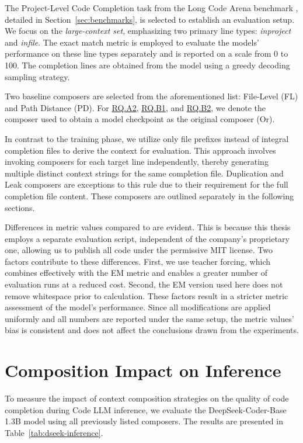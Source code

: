 The Project-Level Code Completion task from the Long Code Arena benchmark \parencite{bogomolov2024}, detailed in Section~\ref{sec:benchmarks}, is selected to establish an evaluation setup. We focus on the \textit{large-context set}, emphasizing two primary line types: \textit{inproject} and \textit{infile}. The exact match metric is employed to evaluate the models' performance on these line types separately and is reported on a scale from 0 to 100. The completion lines are obtained from the model using a greedy decoding sampling strategy.

Two baseline composers are selected from the aforementioned list: File-Level (FL) and Path Distance (PD). For \hyperref[rq:rq-a2]{RQ.A2}, \hyperref[rq:rq-b1]{RQ.B1}, and \hyperref[rq:rq-b2]{RQ.B2}, we denote the composer used to obtain a model checkpoint as the original composer (Or).

In contrast to the training phase, we utilize only file prefixes instead of integral completion files to derive the context for evaluation. This approach involves invoking composers for each target line independently, thereby generating multiple distinct context strings for the same completion file. Duplication and Leak composers are exceptions to this rule due to their requirement for the full completion file content. These composers are outlined separately in the following sections.

Differences in metric values compared to \citet{sapronov2025} are evident. This is because this thesis employs a separate evaluation script, independent of the company's proprietary one, allowing us to publish all code under the permissive MIT license. Two factors contribute to these differences. First, we use teacher forcing, which combines effectively with the EM metric and enables a greater number of evaluation runs at a reduced cost. Second, the EM version used here does not remove whitespace prior to calculation. These factors result in a stricter metric assessment of the model's performance. Since all modifications are applied uniformly and all numbers are reported under the same setup, the metric values' bias is consistent and does not affect the conclusions drawn from the experiments.

\section{Composition Impact on Inference}\label{sec:composition-impact-on-inference}

To measure the impact of context composition strategies on the quality of code completion during Code LLM inference, we evaluate the DeepSeek-Coder-Base 1.3B model \parencite{guo2024} using all previously listed composers. The results are presented in Table~\ref{tab:dseek-inference}.

